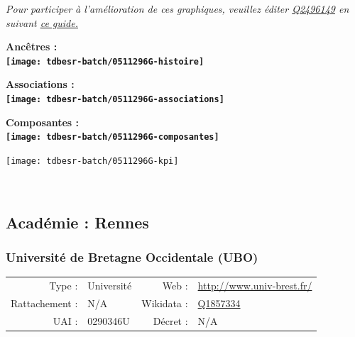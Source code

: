 \documentclass[12pt,french,]{article}
\begin{document}
\textit{\scriptsize Pour participer à l'amélioration de ces graphiques, veuillez éditer  \href{https://www.wikidata.org/entity/Q2496149}{Q2496149}  en suivant \href{https://github.com/cpesr/wikidataESR/blob/master/Rmd/wikidataESR.md}{ce guide.}}

\vspace{1cm}  
\begin{minipage}[b]{0.50\textwidth}\begin{center} \bf Ancêtres : \\  
\texttt{[image: tdbesr-batch/0511296G-histoire]} \end{center}\end{minipage}\begin{minipage}[b]{0.50\textwidth}\begin{center} \bf Associations : \\  
\texttt{[image: tdbesr-batch/0511296G-associations]} \end{center}\end{minipage}

\hrulefill

\begin{center} \bf Composantes : \\  
\texttt{[image: tdbesr-batch/0511296G-composantes]} \end{center}

\begin{center}\texttt{[image: tdbesr-batch/0511296G-kpi]} \end{center}\checkoddpage

\ifoddpage \fi ~\newpage  

\hypertarget{acaduxe9mie-rennes}{%
\subsection{Académie : Rennes}\label{acaduxe9mie-rennes}}

\hypertarget{universituxe9-de-bretagne-occidentale-ubo}{%
\subsubsection{Université de Bretagne Occidentale
(UBO)}\label{universituxe9-de-bretagne-occidentale-ubo}}

\begin{tabular*}{\textwidth}{rp{5cm}rl}  
\hline  
Type : & Université & Web : &\href{http://www.univ-brest.fr/}{http://www.univ-brest.fr/} \\  
Rattachement : & N/A & Wikidata : & \href{https://www.wikidata.org/entity/Q1857334}{Q1857334} \\  
UAI : & 0290346U & Décret : & N/A \\  
\hline  
\end{tabular*}
\end{document}
